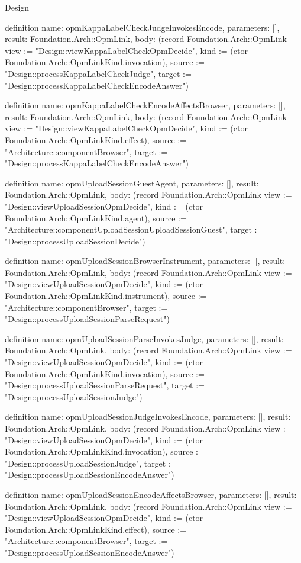 \begin{lexlean}{Design}
\begin{semanticmodule}
definition{
  name: opmKappaLabelCheckJudgeInvokesEncode,
  parameters: [],
  result: Foundation.Arch::OpmLink,
  body: (record Foundation.Arch::OpmLink {view := "Design::viewKappaLabelCheckOpmDecide", kind := (ctor Foundation.Arch::OpmLinkKind.invocation), source := "Design::processKappaLabelCheckJudge", target := "Design::processKappaLabelCheckEncodeAnswer"})
}

definition{
  name: opmKappaLabelCheckEncodeAffectsBrowser,
  parameters: [],
  result: Foundation.Arch::OpmLink,
  body: (record Foundation.Arch::OpmLink {view := "Design::viewKappaLabelCheckOpmDecide", kind := (ctor Foundation.Arch::OpmLinkKind.effect), source := "Architecture::componentBrowser", target := "Design::processKappaLabelCheckEncodeAnswer"})
}

definition{
  name: opmUploadSessionGuestAgent,
  parameters: [],
  result: Foundation.Arch::OpmLink,
  body: (record Foundation.Arch::OpmLink {view := "Design::viewUploadSessionOpmDecide", kind := (ctor Foundation.Arch::OpmLinkKind.agent), source := "Architecture::componentUploadSessionUploadSessionGuest", target := "Design::processUploadSessionDecide"})
}

definition{
  name: opmUploadSessionBrowserInstrument,
  parameters: [],
  result: Foundation.Arch::OpmLink,
  body: (record Foundation.Arch::OpmLink {view := "Design::viewUploadSessionOpmDecide", kind := (ctor Foundation.Arch::OpmLinkKind.instrument), source := "Architecture::componentBrowser", target := "Design::processUploadSessionParseRequest"})
}

definition{
  name: opmUploadSessionParseInvokesJudge,
  parameters: [],
  result: Foundation.Arch::OpmLink,
  body: (record Foundation.Arch::OpmLink {view := "Design::viewUploadSessionOpmDecide", kind := (ctor Foundation.Arch::OpmLinkKind.invocation), source := "Design::processUploadSessionParseRequest", target := "Design::processUploadSessionJudge"})
}

definition{
  name: opmUploadSessionJudgeInvokesEncode,
  parameters: [],
  result: Foundation.Arch::OpmLink,
  body: (record Foundation.Arch::OpmLink {view := "Design::viewUploadSessionOpmDecide", kind := (ctor Foundation.Arch::OpmLinkKind.invocation), source := "Design::processUploadSessionJudge", target := "Design::processUploadSessionEncodeAnswer"})
}

definition{
  name: opmUploadSessionEncodeAffectsBrowser,
  parameters: [],
  result: Foundation.Arch::OpmLink,
  body: (record Foundation.Arch::OpmLink {view := "Design::viewUploadSessionOpmDecide", kind := (ctor Foundation.Arch::OpmLinkKind.effect), source := "Architecture::componentBrowser", target := "Design::processUploadSessionEncodeAnswer"})
}


\end{semanticmodule}
\end{lexlean}
